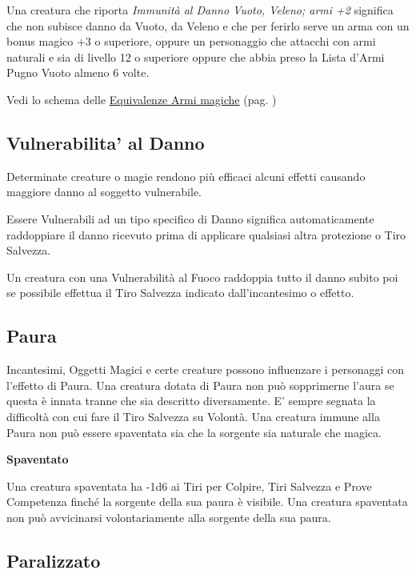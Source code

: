 \begin{multicols}{2}
Una creatura che riporta \emph{Immunità al Danno Vuoto, Veleno; armi +2} significa che non subisce danno da Vuoto, da Veleno e che per ferirlo serve un arma con un bonus magico +3 o superiore, oppure un personaggio che attacchi con armi naturali e sia di livello 12 o superiore oppure che abbia preso la Lista d'Armi Pugno Vuoto almeno 6 volte.

Vedi lo schema delle \hyperlink{equivalenzaarmimagiche}{Equivalenze Armi magiche} (pag. \pageref{equivalenzaarmimagiche})

\subsection{Vulnerabilita' al Danno}\label{vulnerabilitadanno}

Determinate creature o magie rendono più efficaci alcuni effetti causando maggiore danno al soggetto vulnerabile.

Essere Vulnerabili ad un tipo specifico di Danno significa automaticamente raddoppiare il danno ricevuto prima di applicare qualsiasi altra protezione o Tiro Salvezza.

Un creatura con una Vulnerabilità al Fuoco raddoppia tutto il danno subito poi se possibile effettua il Tiro Salvezza indicato dall'incantesimo o effetto.

\subsection{Paura}\label{paura}

Incantesimi, Oggetti Magici e certe creature possono influenzare i personaggi con l'effetto di Paura. Una creatura dotata di Paura non può sopprimerne l'aura se questa è innata tranne che sia descritto diversamente. E' sempre segnata la difficoltà con cui fare il Tiro Salvezza su Volontà. Una creatura immune alla Paura non può essere spaventata sia che la sorgente sia naturale che magica.

\textbf{Spaventato}\label{spaventato}

Una creatura spaventata ha -1d6 ai Tiri per Colpire, Tiri Salvezza e Prove Competenza finché la sorgente della sua paura è visibile. Una creatura spaventata non può avvicinarsi volontariamente alla sorgente della sua paura.

\subsection{Paralizzato}\label{paralizzato}


\end{multicols}
